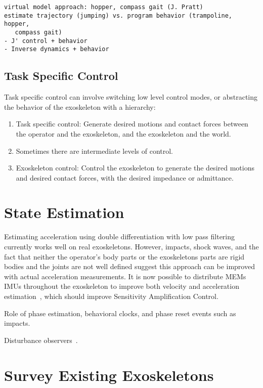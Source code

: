 \documentclass[letterpaper,12pt,fullpage]{article}
\begin{document}
\begin{verbatim}
virtual model approach: hopper, compass gait (J. Pratt)
estimate trajectory (jumping) vs. program behavior (trampoline, hopper,
   compass gait)
- J' control + behavior
- Inverse dynamics + behavior
\end{verbatim}

\subsection{Task Specific Control}

Task specific control can involve switching low level control modes, or abstracting
the behavior of the exoskeleton with a hierarchy:
\begin{enumerate}
\item
Task specific control: Generate desired motions and contact forces between
the operator and the exoskeleton, and the exoskeleton and the world.
\item
Sometimes there are intermediate levels of control.
\item
Exoskeleton control: Control the exoskeleton to generate the desired motions and
desired contact forces, with the desired impedance or admittance.
\end{enumerate}

\section{State Estimation}

Estimating acceleration using double differentiation with low pass filtering
currently works well on real exoskeletons.
However, impacts, shock waves, and the fact that neither
the operator's body parts or the exoskeletons parts are rigid bodies and the
joints are not well defined suggest this approach can be improved with actual
acceleration measurements.
It is now possible to distribute MEMs IMUs throughout the exoskeleton to
improve both velocity and 
acceleration estimation~\cite{Xinjilefu-thesis}, which should improve
Sensitivity Amplification Control.

Role of phase estimation, behavioral clocks, and phase reset events
such as impacts.

Disturbance observers~\cite{IEEE06197032}.


\section{Survey Existing Exoskeletons}
\end{document}
